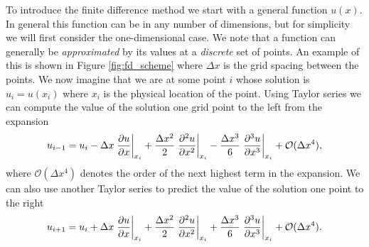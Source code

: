 To introduce the finite difference method we start with a general function $u(x)$. In general this function can be in any number of dimensions, but for simplicity we will first consider the one-dimensional case. We note that a function can generally be {\it approximated} by its values at a {\it discrete} set of points. An example of this is shown in Figure \ref{fig:fd_scheme} where $\Delta x$ is the grid spacing between the points. We now imagine that we are at some point $i$ whose solution is $u_i = u(x_i)$ where $x_i$ is the physical location of the point. Using Taylor series we can compute the value of the solution one grid point to the left from the expansion
\begin{equation}
	u_{i-1} = u_i - \Delta x \left.\frac{\partial u}{\partial x}\right\rvert_{x_i}^{} + \frac{\Delta x^2}{2} \left.\frac{\partial^2 u}{\partial x^2}\right\rvert_{x_i}^{} - \frac{\Delta x^3}{6} \left.\frac{\partial^3 u}{\partial x^3}\right\rvert_{x_i}^{} + \mathcal{O}(\Delta x^4),
	\label{eqn:fdmup}
\end{equation}
where $\mathcal{O}(\Delta x^4)$ denotes the order of the next highest term in the expansion. We can also use another Taylor series to predict the value of the solution one point to the right
\begin{equation}
	u_{i+1} = u_i + \Delta x \left.\frac{\partial u}{\partial x}\right\rvert_{x_i}^{} + \frac{\Delta x^2}{2} \left.\frac{\partial^2 u}{\partial x^2}\right\rvert_{x_i}^{} + \frac{\Delta x^3}{6} \left.\frac{\partial^3 u}{\partial x^3}\right\rvert_{x_i}^{} + \mathcal{O}(\Delta x^4).
	\label{eqn:fdmdwn}
\end{equation}

